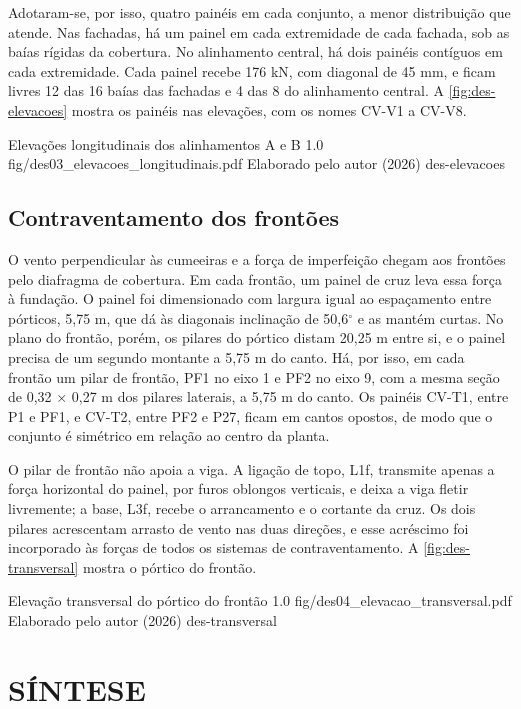 Adotaram-se, por isso, quatro painéis em cada conjunto, a menor distribuição que
atende. Nas fachadas, há um painel em cada extremidade de cada fachada, sob as
baías rígidas da cobertura. No alinhamento central, há dois painéis contíguos em
cada extremidade. Cada painel recebe 176 kN, com diagonal de 45 mm, e ficam
livres 12 das 16 baías das fachadas e 4 das 8 do alinhamento central. A
\autoref{fig:des-elevacoes} mostra os painéis nas elevações, com os nomes CV-V1 a
CV-V8.

\figura
{Elevações longitudinais dos alinhamentos A e B}
{1.0}
{fig/des03_elevacoes_longitudinais.pdf}
{Elaborado pelo autor (2026)}
{des-elevacoes}
{}
{}

\subsection{Contraventamento dos frontões}\label{ssec:predim-cv-frontao}

O vento perpendicular às cumeeiras e a força de imperfeição chegam aos frontões
pelo diafragma de cobertura. Em cada frontão, um painel de cruz leva essa força à
fundação. O painel foi dimensionado com largura igual ao espaçamento entre
pórticos, 5,75 m, que dá às diagonais inclinação de 50,6$^{\circ}$ e as mantém
curtas. No plano do frontão, porém, os pilares do pórtico distam 20,25 m entre
si, e o painel precisa de um segundo montante a 5,75 m do canto. Há, por isso,
em cada frontão um pilar de frontão, PF1 no eixo 1 e PF2 no eixo 9, com a mesma seção de 0,32 $\times$ 0,27 m
dos pilares laterais, a 5,75 m do canto. Os painéis CV-T1, entre P1 e PF1, e
CV-T2, entre PF2 e P27, ficam em cantos opostos, de modo que o conjunto é
simétrico em relação ao centro da planta.

O pilar de frontão não apoia a viga. A ligação de topo, L1f, transmite apenas a
força horizontal do painel, por furos oblongos verticais, e deixa a viga fletir
livremente; a base, L3f, recebe o arrancamento e o cortante da cruz. Os dois
pilares acrescentam arrasto de vento nas duas direções, e esse acréscimo foi
incorporado às forças de todos os sistemas de contraventamento. A
\autoref{fig:des-transversal} mostra o pórtico do frontão.

\figura
{Elevação transversal do pórtico do frontão}
{1.0}
{fig/des04_elevacao_transversal.pdf}
{Elaborado pelo autor (2026)}
{des-transversal}
{}
{}

\section{SÍNTESE}\label{sec:geometria-resultante}

